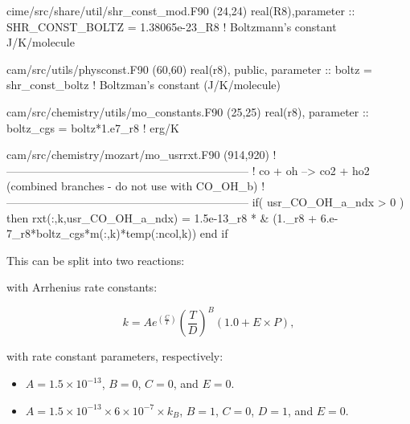 \documentclass[titlepage]{article}
\begin{document}
\begin{blockcode}[commandchars=\\\{\}]
\color{gray}cime/src/share/util/shr_const_mod.F90 (24,24)
   real(R8),parameter :: SHR_CONST_BOLTZ   = 1.38065e-23_R8  ! Boltzmann's constant ~ J/K/molecule
\end{blockcode}
\begin{blockcode}[commandchars=\\\{\}]
\color{gray}cam/src/utils/physconst.F90 (60,60)
real(r8), public, parameter :: boltz       = shr_const_boltz      ! Boltzman's constant (J/K/molecule)
\end{blockcode}
\begin{blockcode}[commandchars=\\\{\}]
\color{gray}cam/src/chemistry/utils/mo_constants.F90 (25,25)
  real(r8), parameter ::  boltz_cgs   = boltz*1.e7_r8       ! erg/K
\end{blockcode}
\begin{blockcode}[commandchars=\\\{\}]
\color{gray}cam/src/chemistry/mozart/mo_usrrxt.F90 (914,920)
!-----------------------------------------------------------------
!           co + oh --> co2 + ho2     (combined branches - do not use with CO_OH_b)
!-----------------------------------------------------------------
       if( usr_CO_OH_a_ndx > 0 ) then
          rxt(:,k,usr_CO_OH_a_ndx) = 1.5e-13_r8 * &
               (1._r8 + 6.e-7_r8*boltz_cgs*m(:,k)*temp(:ncol,k))
       end if
\end{blockcode}

This can be split into two reactions:
\vspace{20px}



\vspace{20px}

\noindent with Arrhenius rate constants:

\begin{equation}
k = Ae^{(\frac{C}{T})}(\frac{T}{D})^B(1.0+E \times P),
\end{equation}

\noindent with rate constant parameters, respectively:

\begin{itemize}
\item $A = 1.5 \times 10^{-13}$, $B = 0$, $C = 0$, and $E = 0$.
\item $A = 1.5 \times 10^{-13} \times 6 \times 10^{-7} \times k_B$, $B = 1$, $C = 0$, $D = 1$, and $E = 0$.
\end{itemize}
\end{document}
